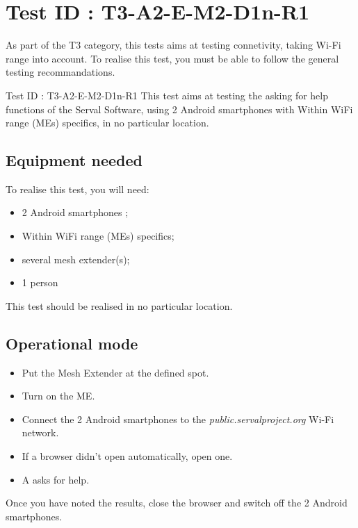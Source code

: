 \documentclass[oneside]{book}
\begin{document}
\section{Test ID : T3-A2-E-M2-D1n-R1}
\begin{itshape}
As part of the T3 category, this tests aims at testing connetivity, taking Wi-Fi range into account.
To realise this test, you must be able to follow the general testing recommandations.
\end{itshape}
\newline
Test ID : T3-A2-E-M2-D1n-R1
 This test aims at testing the asking for help functions of the Serval Software, using 2 Android smartphones with Within WiFi range (MEs)  specifics, in no particular location.
\subsection{Equipment needed} To realise this test, you will need:
\begin{itemize}
\item 2 Android smartphones ;
\item Within WiFi range (MEs)  specifics;
\item several mesh extender(s);
\item 1 person
\end{itemize}
This test should be realised in no particular location.
\subsection{Operational mode} \begin{itemize}
\item Put the Mesh Extender at the defined spot.
\item Turn on the ME.
\item Connect the 2 Android smartphones to the \emph{public.servalproject.org} Wi-Fi network.
\item If a browser didn't open automatically, open one.
\item A asks for help.
\end{itemize}
Once you have noted the results, close the browser and switch off the 2 Android smartphones.
\end{document}
